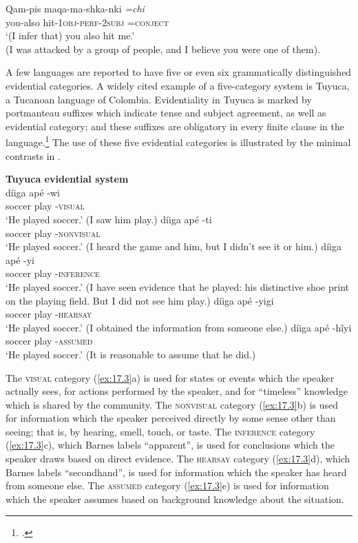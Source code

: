 \ex \gll Qam-pis  maqa-ma-shka-nki  \textit{=chi}\\
you-also  hit-1\textsc{obj}-\textsc{perf-2subj  =conject}\\
\glt ‘(I infer that) you also hit me.’\\
(I was attacked by a group of people, and I believe you were one of them).
\z \z


A few languages are reported to have five or even six grammatically distinguished evidential categories. A widely cited example of a five-category system is Tuyuca, a Tucanoan language of Colombia. Evidentiality in Tuyuca is marked by portmanteau suffixes which indicate tense and subject agreement, as well as evidential category; and these suffixes are obligatory in every finite clause in the language.\footnote{\citet{Barnes1984}.} The use of these five evidential categories is illustrated by the minimal contrasts in .


\ea \label{ex:17.3}
\textbf{Tuyuca evidential system} \citep{Barnes1984}\\
\ea  \gll  díiga  apé  -wi  \\
soccer  play  -\textsc{visual}\\
\glt ‘He played soccer.’ (I saw him play.)
\ex \gll díiga  apé  -ti\\
soccer  play  -\textsc{nonvisual}\\
\glt ‘He played soccer.’ (I heard the game and him, but I didn’t see it or him.)
\ex \gll  díiga  apé  -yi\\
soccer  play  -\textsc{inference}\\
\glt ‘He played soccer.’ (I have seen evidence that he played: his distinctive shoe print on the playing field. But I did not see him play.)
\ex \gll  díiga  apé  -yigi\\
soccer  play  -\textsc{hearsay}\\
\glt ‘He played soccer.’ (I obtained the information from someone else.)
\ex \gll  díiga  apé  -hĩyi\\
soccer  play  -\textsc{assumed}\\
\glt ‘He played soccer.’ (It is reasonable to assume that he did.)
\z \z


The \textsc{visual} category (\ref{ex:17.3}a) is used for states or events which the speaker actually sees, for actions performed by the speaker, and for “timeless” knowledge which is shared by the community. The \textsc{nonvisual} category (\ref{ex:17.3}b) is used for information which the speaker perceived directly by some sense other than seeing; that is, by hearing, smell, touch, or taste. The \textsc{inference} category (\ref{ex:17.3}c), which Barnes labels “apparent”, is used for conclusions which the speaker draws based on direct evidence. The \textsc{hearsay} category (\ref{ex:17.3}d), which Barnes labels “secondhand”, is used for information which the speaker has heard from someone else. The \textsc{assumed} category (\ref{ex:17.3}e) is used for information which the speaker assumes based on background knowledge about the situation.


